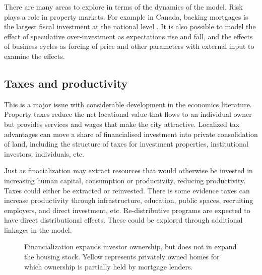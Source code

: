 There are many areas to explore in terms of the dynamics of the model. Risk plays a role in property markets. For example in Canada, backing mortgages is the largest fiscal 
investment at the national level \cite{nemtinFinancializationHousingSocial2021}. It is also possible to model the effect of speculative over-investment as expectations rise and fall, and the effects of business cycles as forcing of price and other parameters with external input to examine the effects.

\subsection{Taxes and productivity} %
This is a major issue with considerable development in the economics literature. Property taxes reduce the net locational value that flows to an individual owner but provides services and wages that make the city attractive. 
Localized tax advantages can move a share of financialised investment into private consolidation of land, 
including the structure of taxes for investment properties, institutional investors, individuals, etc.

Just as finacialization may extract resources that would otherwise be invested in increasing human capital, consumption or productivity, reducing productivity. Taxes could either be extracted or reinvested. There is some evidence taxes can increase productivity through infrastructure, education, public spaces, recruiting employers, and direct investment, etc. Re-distributive programs are expected to have direct distributional effects. These could be explored through additional linkages in the model.








 

\begin{figure}[ht]
\begin{center}

\end{center}
\caption{Financialization expands investor ownership, but does not in expand the housing stock. Yellow represents privately owned homes for which ownership is partially held by mortgage lenders.}
\label{fig-financialization-expansion}
\end{figure}



